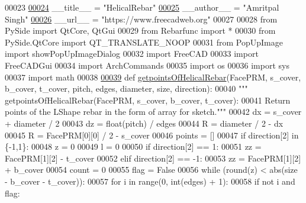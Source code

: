 \begin{DoxyCode}
00023 
\hypertarget{HelicalRebar_8py_source.tex_l00024}{}\hyperlink{namespaceHelicalRebar_a28c95505364eadd0c2d4abbd80091bef}{00024} \_\_title\_\_ = \textcolor{stringliteral}{"HelicalRebar"}
\hypertarget{HelicalRebar_8py_source.tex_l00025}{}\hyperlink{namespaceHelicalRebar_a925dcfed2ffef215413157f48d7b6e57}{00025} \_\_author\_\_ = \textcolor{stringliteral}{"Amritpal Singh"}
\hypertarget{HelicalRebar_8py_source.tex_l00026}{}\hyperlink{namespaceHelicalRebar_a9c74e4634d00eef07ed630054e69fbff}{00026} \_\_url\_\_ = \textcolor{stringliteral}{"https://www.freecadweb.org"}
00027 
00028 \textcolor{keyword}{from} PySide \textcolor{keyword}{import} QtCore, QtGui
00029 \textcolor{keyword}{from} Rebarfunc \textcolor{keyword}{import} *
00030 \textcolor{keyword}{from} PySide.QtCore \textcolor{keyword}{import} QT\_TRANSLATE\_NOOP
00031 \textcolor{keyword}{from} PopUpImage \textcolor{keyword}{import} showPopUpImageDialog
00032 \textcolor{keyword}{import} FreeCAD
00033 \textcolor{keyword}{import} FreeCADGui
00034 \textcolor{keyword}{import} ArchCommands
00035 \textcolor{keyword}{import} os
00036 \textcolor{keyword}{import} sys
00037 \textcolor{keyword}{import} math
00038 
\hypertarget{HelicalRebar_8py_source.tex_l00039}{}\hyperlink{namespaceHelicalRebar_a4fcf2dabc065c39ce5c8cf6995051352}{00039} \textcolor{keyword}{def }\hyperlink{namespaceHelicalRebar_a4fcf2dabc065c39ce5c8cf6995051352}{getpointsOfHelicalRebar}(FacePRM, s\_cover, b\_cover, t\_cover, pitch, edges, 
      diameter, size, direction):
00040     \textcolor{stringliteral}{""" getpointsOfHelicalRebar(FacePRM, s\_cover, b\_cover, t\_cover):}
00041 \textcolor{stringliteral}{    Return points of the LShape rebar in the form of array for sketch."""}
00042     dx = s\_cover + diameter / 2
00043     dz = float(pitch) / edges
00044     R = diameter / 2 - dx
00045     R = FacePRM[0][0] / 2 - s\_cover
00046     points = []
00047     \textcolor{keywordflow}{if} direction[2] \textcolor{keywordflow}{in} \{-1,1\}:
00048         z = 0
00049         l = 0
00050         \textcolor{keywordflow}{if} direction[2] == 1:
00051             zz = FacePRM[1][2] - t\_cover
00052         \textcolor{keywordflow}{elif} direction[2] == -1:
00053             zz = FacePRM[1][2] + b\_cover
00054         count = 0
00055         flag = \textcolor{keyword}{False}
00056         \textcolor{keywordflow}{while} (round(z) < abs(size - b\_cover - t\_cover)):
00057             \textcolor{keywordflow}{for} i \textcolor{keywordflow}{in} range(0, int(edges) + 1):
00058                 \textcolor{keywordflow}{if} \textcolor{keywordflow}{not} i \textcolor{keywordflow}{and} flag:

\end{DoxyCode}

